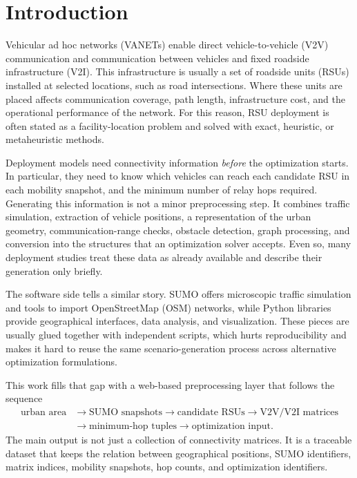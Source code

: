 \documentclass[engproc,proceedingpaper,submit,oneauthor]{Definitions/mdpi}
\newcommand{\added}[1]{{\color{revisionblue}#1}}
\begin{document}
	
	\section{Introduction}
	
	Vehicular ad hoc networks (VANETs) enable direct vehicle-to-vehicle (V2V)
	communication and communication between vehicles and fixed roadside infrastructure
	(V2I). This infrastructure is usually a set of roadside units (RSUs) installed at
	selected locations, such as road intersections. Where these units are placed affects
	communication coverage, path length, infrastructure cost, and the operational
	performance of the network. For this reason, RSU deployment is often stated as a
	facility-location problem and solved with exact, heuristic, or metaheuristic methods.
	
	Deployment models need connectivity information \emph{before} the optimization
	starts. In particular, they need to know which vehicles can reach each candidate RSU
	in each mobility snapshot, and the minimum number of relay hops required. Generating
	this information is not a minor preprocessing step. It combines traffic simulation,
	extraction of vehicle positions, a representation of the urban geometry,
	communication-range checks, obstacle detection, graph processing, and conversion into
	the structures that an optimization solver accepts. Even so, many deployment studies
	treat these data as already available and describe their generation only briefly.
	
	The software side tells a similar story. SUMO offers microscopic traffic simulation
	and tools to import OpenStreetMap (OSM) networks, while Python libraries provide
	geographical interfaces, data analysis, and visualization. These pieces are usually
	glued together with independent scripts, which hurts reproducibility and makes it
	hard to reuse the same scenario-generation process across alternative optimization
	formulations.
	
	This work fills that gap with a web-based preprocessing layer that follows the
	sequence
	\[
	\begin{aligned}
		\text{urban area}&\rightarrow\text{SUMO snapshots}\rightarrow\text{candidate RSUs}
		\rightarrow\text{V2V/V2I matrices}\\
		&\rightarrow\text{minimum-hop tuples}\rightarrow\text{optimization input}.
	\end{aligned}
	\]
	\added{The main output is not just a collection of connectivity matrices. It is a
		traceable dataset that keeps the relation between geographical positions, SUMO
		identifiers, matrix indices, mobility snapshots, hop counts, and optimization
		identifiers.}
	
\end{document}
